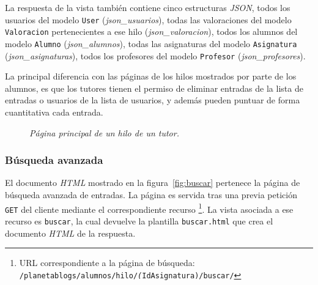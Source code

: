 \documentclass[a4paper, 12pt]{book}
\begin{document}
La respuesta de la vista tambi\'en contiene cinco estructuras \textit{JSON}, todos los usuarios del modelo \texttt{User} (\textit{json\_usuarios}), 
todas las valoraciones del modelo \texttt{Valoracion} pertenecientes a ese hilo (\textit{json\_valoracion}), todos los alumnos del modelo \texttt{Alumno} 
(\textit{json\_alumnos}), todas las asignaturas del modelo \texttt{Asignatura} (\textit{json\_asignaturas}), todos los profesores del modelo \texttt{Profesor} 
(\textit{json\_profesores}).

La principal diferencia con las p\'aginas de los hilos mostrados por parte de los alumnos, es que los tutores tienen el permiso de eliminar entradas de la 
lista de entradas o usuarios de la lista de usuarios, y adem\'as pueden puntuar de forma cuantitativa cada entrada.

\begin{figure}
  \centering
  \caption{\textit{P\'agina principal de un hilo de un tutor.}}
  \label{fig:hilotutor}
\end{figure}


\subsubsection{B\'usqueda avanzada} 
\label{sec:buscar}
El documento \textit{HTML} mostrado en la figura~\ref{fig:buscar} pertenece la p\'agina de b\'usqueda avanzada de entradas. 
La p\'agina es servida tras una previa petici\'on \texttt{GET} del cliente mediante el correspondiente recurso \footnote{URL correspondiente a la p\'agina de 
b\'usqueda: \texttt{/planetablogs/alumnos/hilo/\textit(IdAsignatura)/buscar/}}. La vista asociada a ese recurso es \texttt{buscar}, la cual 
devuelve la plantilla \texttt{buscar.html} que crea el documento \textit{HTML} de la respuesta.
\end{document}
